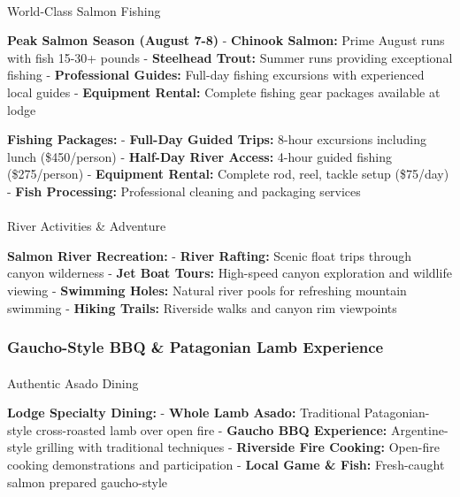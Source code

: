 \documentclass[
  11pt,
  letterpaper,
  DIV=10,
  numbers=noendperiod]{scrartcl}
\makeatletter
\let\oldparagraph\paragraph
\renewcommand{\paragraph}{
    \@ifstar
      \xxxParagraphStar
      \xxxParagraphNoStar
  }
\newcommand{\xxxParagraphStar}[1]{\oldparagraph*{#1}\mbox{}}
\newcommand{\xxxParagraphNoStar}[1]{\oldparagraph{#1}\mbox{}}
\makeatother
\begin{document}
\paragraph{World-Class Salmon Fishing}\label{world-class-salmon-fishing}

\textbf{Peak Salmon Season (August 7-8)} - \textbf{Chinook Salmon:}
Prime August runs with fish 15-30+ pounds - \textbf{Steelhead Trout:}
Summer runs providing exceptional fishing - \textbf{Professional
Guides:} Full-day fishing excursions with experienced local guides -
\textbf{Equipment Rental:} Complete fishing gear packages available at
lodge

\textbf{Fishing Packages:} - \textbf{Full-Day Guided Trips:} 8-hour
excursions including lunch (\$450/person) - \textbf{Half-Day River
Access:} 4-hour guided fishing (\$275/person) - \textbf{Equipment
Rental:} Complete rod, reel, tackle setup (\$75/day) - \textbf{Fish
Processing:} Professional cleaning and packaging services

\paragraph{River Activities \&
Adventure}\label{river-activities-adventure}

\textbf{Salmon River Recreation:} - \textbf{River Rafting:} Scenic float
trips through canyon wilderness - \textbf{Jet Boat Tours:} High-speed
canyon exploration and wildlife viewing - \textbf{Swimming Holes:}
Natural river pools for refreshing mountain swimming - \textbf{Hiking
Trails:} Riverside walks and canyon rim viewpoints

\subsubsection{Gaucho-Style BBQ \& Patagonian Lamb
Experience}\label{gaucho-style-bbq-patagonian-lamb-experience}

\paragraph{Authentic Asado Dining}\label{authentic-asado-dining}

\textbf{Lodge Specialty Dining:} - \textbf{Whole Lamb Asado:}
Traditional Patagonian-style cross-roasted lamb over open fire -
\textbf{Gaucho BBQ Experience:} Argentine-style grilling with
traditional techniques - \textbf{Riverside Fire Cooking:} Open-fire
cooking demonstrations and participation - \textbf{Local Game \& Fish:}
Fresh-caught salmon prepared gaucho-style
\end{document}
